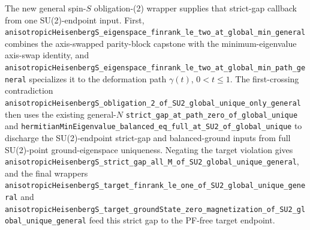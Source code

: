 \documentclass[a4paper,11pt]{article}
\begin{document}
The new general spin-\(S\) obligation-(2) wrapper supplies that strict-gap
callback from one SU(2)-endpoint input.  First,
\texttt{anisotropicHeisenbergS\_eigenspace\_finrank\_le\_two\_at\_global\_min\_general}
combines the axis-swapped parity-block capstone with the minimum-eigenvalue
axis-swap identity, and
\texttt{anisotropicHeisenbergS\_eigenspace\_finrank\_le\_two\_at\_global\_min\_path\_general}
specializes it to the deformation path \(\gamma(t)\), \(0<t\le1\).  The
first-crossing contradiction
\texttt{anisotropicHeisenbergS\_obligation\_2\_of\_SU2\_global\_unique\_only\_general}
then uses the existing general-\(N\)
\texttt{strict\_gap\_at\_path\_zero\_of\_global\_unique} and
\texttt{hermitianMinEigenvalue\_balanced\_eq\_full\_at\_SU2\_of\_global\_unique}
to discharge the SU(2)-endpoint strict-gap and balanced-ground inputs from
full SU(2)-point ground-eigenspace uniqueness.  Negating the target violation
gives
\texttt{anisotropicHeisenbergS\_strict\_gap\_all\_M\_of\_SU2\_global\_unique\_general},
and the final wrappers
\texttt{anisotropicHeisenbergS\_target\_finrank\_le\_one\_of\_SU2\_global\_unique\_general}
and
\texttt{anisotropicHeisenbergS\_target\_groundState\_zero\_magnetization\_of\_SU2\_global\_unique\_general}
feed this strict gap to the PF-free target endpoint.
\end{document}
